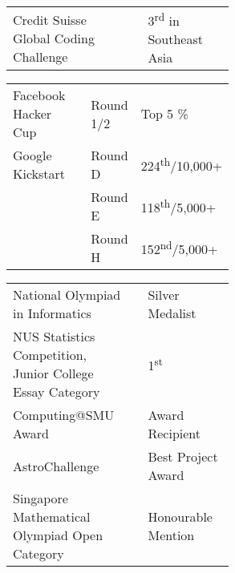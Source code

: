 \documentclass[a4paper,hidelinks]{resume} %
\begin{document}
\begin{minipage}[t]{0.49\textwidth}
    
    \begin{tabular}{p{0.55\linewidth} p{0\linewidth} l}
        {Credit Suisse Global Coding Challenge} & & 3\textsuperscript{rd} in Southeast Asia \\
    \end{tabular}
    \begin{tabular}{p{0.37\linewidth} p{0.18\linewidth} l}
        Facebook Hacker Cup & Round 1/2 & Top 5 \% \\
        Google Kickstart & Round D & 224\textsuperscript{th}/10,000+ \\
        & Round E & 118\textsuperscript{th}/5,000+\\
        & Round H & 152\textsuperscript{nd}/5,000+ \\
    \end{tabular}
    
    \sectionspace %
    
    
    \begin{tabular}{p{0.55\linewidth} p{0\linewidth} l}
        National Olympiad in Informatics & & Silver Medalist \\
        NUS Statistics Competition, Junior College Essay Category & & 1\textsuperscript{st} \\
        Computing@SMU Award & & Award Recipient\\
        AstroChallenge & & Best Project Award\\
        Singapore Mathematical Olympiad Open Category & & Honourable Mention\\
    \end{tabular}
    
    \sectionspace %


\end{minipage} %
\hfill
%
%
\end{document}
